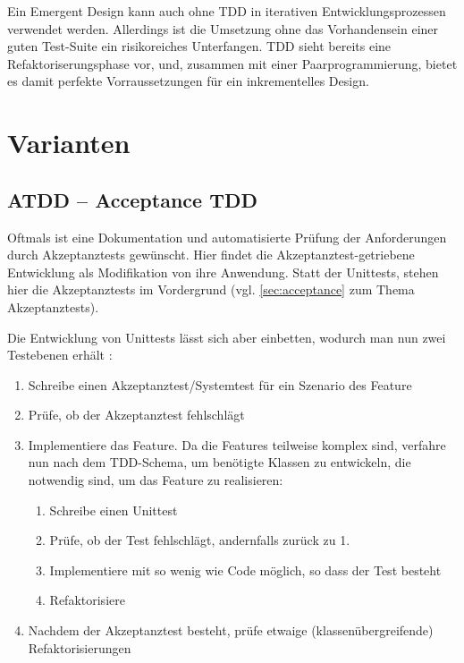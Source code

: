 Ein Emergent Design kann auch ohne TDD in iterativen Entwicklungsprozessen verwendet werden. Allerdings ist die Umsetzung ohne das Vorhandensein einer guten Test-Suite ein risikoreiches Unterfangen. TDD sieht bereits eine Refaktoriserungsphase vor, und, zusammen mit einer Paarprogrammierung, bietet es damit perfekte Vorraussetzungen für ein inkrementelles Design.

\section{Varianten}
\subsection{ATDD -- Acceptance TDD}
\label{sec:attd}

Oftmals ist eine Dokumentation und automatisierte Prüfung der Anforderungen durch Akzeptanztests gewünscht. Hier findet die Akzeptanztest-getriebene Entwicklung als Modifikation von  ihre Anwendung. Statt der Unittests, stehen hier die Akzeptanztests im Vordergrund (vgl. \ref{sec:acceptance} zum Thema Akzeptanztests).

Die Entwicklung von Unittests lässt sich aber einbetten, wodurch man nun zwei Testebenen erhält \citep[S. 285]{chelimsky_rspec_2010}:

\begin{enumerate}
 \item Schreibe einen Akzeptanztest/Systemtest für ein Szenario des Feature
 \item Prüfe, ob der Akzeptanztest fehlschlägt
 \item Implementiere das Feature. Da die Features teilweise komplex sind, verfahre nun nach dem TDD-Schema, um benötigte Klassen zu entwickeln, die notwendig sind, um das Feature zu realisieren:
  \begin{enumerate}
   \item Schreibe einen Unittest
   \item Prüfe, ob der Test fehlschlägt, andernfalls zurück zu 1.
   \item Implementiere mit so wenig wie Code möglich, so dass der Test besteht
   \item Refaktorisiere
  \end{enumerate}
 \item Nachdem der Akzeptanztest besteht, prüfe etwaige (klassenübergreifende) Refaktorisierungen
\end{enumerate}

